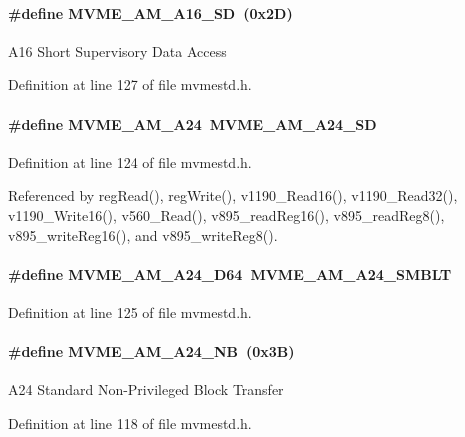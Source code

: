 \paragraph[{MVME\_\-AM\_\-A16\_\-SD}]{\setlength{\rightskip}{0pt plus 5cm}\#define MVME\_\-AM\_\-A16\_\-SD~(0x2D)}\hfill\label{group__mvmestdinclude_gaf0a01859770bb4849814cd77f2812908}
A16 Short Supervisory Data Access 

Definition at line 127 of file mvmestd.h.
\paragraph[{MVME\_\-AM\_\-A24}]{\setlength{\rightskip}{0pt plus 5cm}\#define MVME\_\-AM\_\-A24~MVME\_\-AM\_\-A24\_\-SD}\hfill\label{group__mvmestdinclude_ga501fb1503ced266bf69999572dd9f54f}


Definition at line 124 of file mvmestd.h.

Referenced by regRead(), regWrite(), v1190\_\-Read16(), v1190\_\-Read32(), v1190\_\-Write16(), v560\_\-Read(), v895\_\-readReg16(), v895\_\-readReg8(), v895\_\-writeReg16(), and v895\_\-writeReg8().
\paragraph[{MVME\_\-AM\_\-A24\_\-D64}]{\setlength{\rightskip}{0pt plus 5cm}\#define MVME\_\-AM\_\-A24\_\-D64~MVME\_\-AM\_\-A24\_\-SMBLT}\hfill\label{group__mvmestdinclude_gaac9badc5fe696517d50141d72246e63f}


Definition at line 125 of file mvmestd.h.
\paragraph[{MVME\_\-AM\_\-A24\_\-NB}]{\setlength{\rightskip}{0pt plus 5cm}\#define MVME\_\-AM\_\-A24\_\-NB~(0x3B)}\hfill\label{group__mvmestdinclude_ga7df6e64988001896058d216dc3e375a1}
A24 Standard Non-\/Privileged Block Transfer 

Definition at line 118 of file mvmestd.h.
